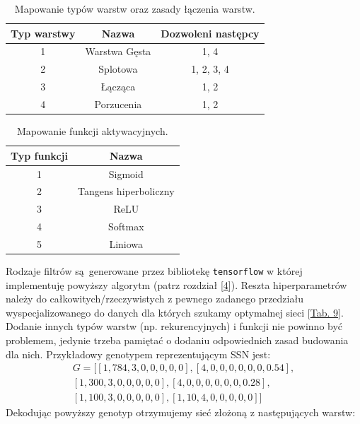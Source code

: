 \documentclass{article}
\begin{document}
\begin{table}[H]
\centering
\begin{tabular}{|c|c|c|}
	\hline
	Typ warstwy & Nazwa & Dozwoleni następcy \\
	\hline
	1 & Warstwa Gęsta & 1, 4\\
	2 & Splotowa & 1, 2, 3, 4\\
	3 & Łącząca & 1, 2\\
	4 & Porzucenia & 1, 2 \\
	\hline
\end{tabular}
\caption{\label{tab:rules}Mapowanie typów warstw oraz zasady łączenia warstw.}
\end{table}
\begin{table}[H]
\centering
\begin{tabular}{|c|c|}
	\hline
	Typ funkcji & Nazwa\\
	\hline
	1 & Sigmoid \\
	2 & Tangens hiperboliczny \\
	3 & ReLU \\
	4 & Softmax \\
	5 & Liniowa \\
	\hline
\end{tabular}
\caption{\label{tab:fun}Mapowanie funkcji aktywacyjnych.}
\end{table}
Rodzaje filtrów są generowane przez bibliotekę \texttt{tensorflow} w której implementuję 
powyższy algorytm (patrz rozdział [\hyperref[sec:imp]{4}]).
Reszta hiperparametrów należy do całkowitych/rzeczywistych z pewnego zadanego przedziału 
wyspecjalizowanego do danych dla których szukamy optymalnej sieci
[\hyperref[tab:fm_zakes]{Tab. 9}].\\
Dodanie innych typów warstw (np. rekurencyjnych) i funkcji nie powinno być problemem, jedynie
trzeba pamiętać o dodaniu odpowiednich zasad budowania dla nich.
Przykładowy genotypem reprezentującym SSN jest:\\
\begin{align*}
	  G = \big[[1, 784, 3, 0, 0, 0, 0, 0], [4, 0, 0, 0, 0, 0, 0, 0.54],\\
	          [1, 300, 3, 0, 0, 0, 0, 0], [4, 0, 0, 0, 0, 0, 0, 0.28],\\ 
	          [1, 100, 3, 0, 0, 0, 0, 0], [1, 10, 4, 0, 0, 0, 0, 0]\big]
\end{align*}
Dekodując powyższy genotyp otrzymujemy sieć złożoną z następujących warstw:\\
\end{document}
